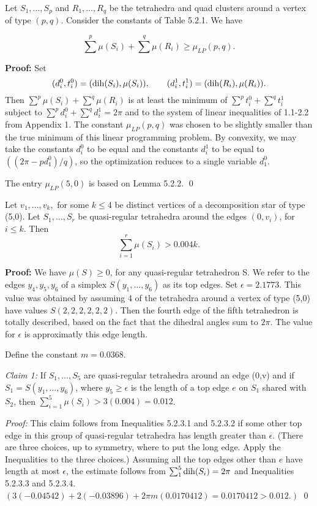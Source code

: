  Let $S_1,\dots,S_p$ and $R_1,\dots,R_q$ be the tetrahedra and quad clusters around a vertex of type $(p,q)$.  Consider the constants of Table 5.2.1.  We have 

$$\sum^p \mu (S_i) + \sum^q \mu (R_i) \geq \mu_{LP}(p,q).$$  \endproclaim

{\bf Proof:} Set 
$$(d_i^0,t_i^0)=(\operatorname{dih}(S_i),\mu(S_i)),\qquad 
(d_i^1,t_i^1)=(\operatorname{dih}(R_i),\mu(R_i)).$$  Then
$\sum^p\mu(S_i)+\sum^q\mu(R_i)$ is at least the minimum
of $\sum^p t_i^0+\sum^q t_i^1$ subject to
$\sum^p d_i^0+\sum^q d_i^1 = 2\pi$ and to the system
of linear inequalities of 1.1-2.2 from Appendix 1.
The constant $\mu_{LP}(p,q)$ was chosen to be slightly smaller
than the true minimum of this linear programming problem.  
By convexity, we may take the constants $d_i^0$ to be equal and
the constants $d_i^1$ to be equal to $((2\pi-pd_1^0)/q)$, so the
optimization reduces to a single variable $d_1^0$.

The entry $\mu_{LP}(5,0)$ is based on Lemma 5.2.2.  \qed


 Let $v_1,\dots,v_k,$ for some $k\leq 4$ be distinct vertices of a decomposition star of type (5,0).  Let $S_1,\dots,S_r$ be quasi-regular tetrahedra around the edges $(0,v_i)$, for $i\leq k$.  
Then $$\sum_{i=1}^r \mu(S_i)> 0.004 k.$$  \endproclaim

{\bf Proof:} We have $\mu(S)\geq 0$, for any quasi-regular tetrahedron S.  We refer to the edges $y_4,y_5,y_6$ of a simplex $S(y_1,\dots,y_6)$ as its top edges.  Set $\epsilon=2.1773$.  This value was obtained by assuming 4 of the tetrahedra around a vertex of type (5,0) have values $S(2,2,2,2,2,2)$.  Then the fourth edge of the  fifth tetrahedron is totally described, based on the fact that the dihedral angles sum to $2 \pi$.  The value for  $\epsilon$ is approximatly this edge length.

Define the constant $m=0.0368$.


{\it Claim 1:}  If $S_1,\dots, S_5$ are quasi-regular tetrahedra around an edge (0,v) and if $S_1=S(y_1,\dots,y_6)$, where $y_5\geq \epsilon$ is the length of a top edge $e$ on $S_1$ shared with $S_2$, then 
$\sum_{i=1}^5 \mu(S_i) > 3 (0.004)=0.012$.  

{\it Proof:}  This claim follows from Inequalities 5.2.3.1 and 5.2.3.2 if some other top edge in this group of quasi-regular tetrahedra has length greater than $\epsilon$.  (There are three choices, up to symmetry, where to put the long edge.  Apply the Inequalities to the three choices.)
Assuming all the top edges other than $e$ have length at most $\epsilon$, the estimate follows from $\sum_1^5 \operatorname{dih}(S_i)=2 \pi$ and Inequalities 5.2.3.3 and 5.2.3.4. 
 $(3 (-0.04542) + 2 (-0.03896) + 2 \pi m (0.0170412) = 0.0170412 > 0.012.)$
\qed

